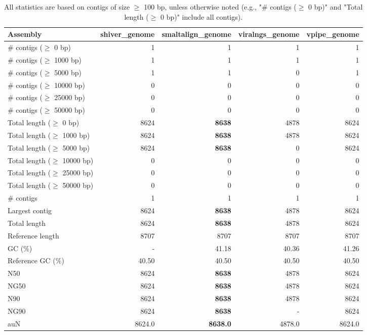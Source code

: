 \documentclass[12pt,a4paper]{article}
\begin{document}
\begin{table}[ht]
\begin{center}
\caption{All statistics are based on contigs of size $\geq$ 100 bp, unless otherwise noted (e.g., "\# contigs ($\geq$ 0 bp)" and "Total length ($\geq$ 0 bp)" include all contigs).}
\begin{tabular}{|l*{4}{|r}|}
\hline
Assembly & shiver\_genome & smaltalign\_genome & viralngs\_genome & vpipe\_genome \\ \hline
\# contigs ($\geq$ 0 bp) & 1 & 1 & 1 & 1 \\ \hline
\# contigs ($\geq$ 1000 bp) & 1 & 1 & 1 & 1 \\ \hline
\# contigs ($\geq$ 5000 bp) & 1 & 1 & 0 & 1 \\ \hline
\# contigs ($\geq$ 10000 bp) & 0 & 0 & 0 & 0 \\ \hline
\# contigs ($\geq$ 25000 bp) & 0 & 0 & 0 & 0 \\ \hline
\# contigs ($\geq$ 50000 bp) & 0 & 0 & 0 & 0 \\ \hline
Total length ($\geq$ 0 bp) & 8624 & {\bf 8638} & 4878 & 8624 \\ \hline
Total length ($\geq$ 1000 bp) & 8624 & {\bf 8638} & 4878 & 8624 \\ \hline
Total length ($\geq$ 5000 bp) & 8624 & {\bf 8638} & 0 & 8624 \\ \hline
Total length ($\geq$ 10000 bp) & 0 & 0 & 0 & 0 \\ \hline
Total length ($\geq$ 25000 bp) & 0 & 0 & 0 & 0 \\ \hline
Total length ($\geq$ 50000 bp) & 0 & 0 & 0 & 0 \\ \hline
\# contigs & 1 & 1 & 1 & 1 \\ \hline
Largest contig & 8624 & {\bf 8638} & 4878 & 8624 \\ \hline
Total length & 8624 & {\bf 8638} & 4878 & 8624 \\ \hline
Reference length & 8707 & 8707 & 8707 & 8707 \\ \hline
GC (\%) & - & 41.18 & 40.36 & 41.26 \\ \hline
Reference GC (\%) & 40.50 & 40.50 & 40.50 & 40.50 \\ \hline
N50 & 8624 & {\bf 8638} & 4878 & 8624 \\ \hline
NG50 & 8624 & {\bf 8638} & 4878 & 8624 \\ \hline
N90 & 8624 & {\bf 8638} & 4878 & 8624 \\ \hline
NG90 & 8624 & {\bf 8638} & - & 8624 \\ \hline
auN & 8624.0 & {\bf 8638.0} & 4878.0 & 8624.0 \\ \hline

\end{tabular}
\end{center}
\end{table}
\end{document}
